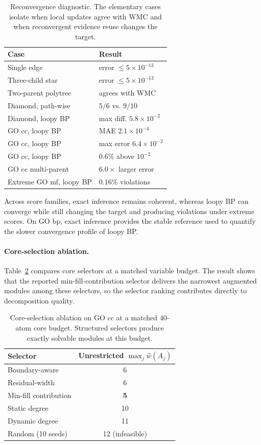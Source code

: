 \documentclass[letterpaper]{article}
\begin{document}
\begin{table}[t]
\centering
\small
\setlength{\tabcolsep}{3pt}
\begin{tabular}{ll}
\toprule
Case & Result \\
\midrule
Single edge & error \(\le 5{\times}10^{-13}\) \\
Three-child star & error \(\le 5{\times}10^{-13}\) \\
Two-parent polytree & agrees with WMC \\
Diamond, path-wise & \(5/6\) vs. \(9/10\) \\
Diamond, loopy BP & max diff. \(5.8{\times}10^{-2}\) \\
GO cc, loopy BP & MAE \(2.1{\times}10^{-4}\) \\
GO cc, loopy BP & max error \(6.4{\times}10^{-2}\) \\
GO cc, loopy BP & \(0.6\%\) above \(10^{-2}\) \\
GO cc multi-parent & \(6.0{\times}\) larger error \\
Extreme GO mf, loopy BP & \(0.16\%\) violations \\
\bottomrule
\end{tabular}
\caption{Reconvergence diagnostic. The elementary cases isolate when
local updates agree with WMC and when reconvergent evidence reuse changes
the target.}
\label{tab:reconv}
\end{table}

Across score families, exact inference remains coherent, whereas loopy
BP can converge while still changing the target and producing violations
under extreme scores. On GO bp, exact inference provides the stable
reference used to quantify the slower convergence profile of loopy BP.

\paragraph{Core-selection ablation.}
Table~\ref{tab:core-ablation} compares core selectors at a matched
variable budget. The result shows that the reported
min-fill-contribution selector delivers the narrowest augmented modules
among these selectors, so the selector ranking contributes directly to
decomposition quality.

\begin{table}[t]
\centering
\small
\setlength{\tabcolsep}{3pt}
\begin{tabular}{lc}
\toprule
Selector & Unrestricted \(\max_j\widehat w(A_j)\) \\
\midrule
Boundary-aware & 6 \\
Residual-width & 6 \\
Min-fill contribution & \textbf{5} \\
Static degree & 10 \\
Dynamic degree & 11 \\
Random (10 seeds) & 12 (infeasible) \\
\bottomrule
\end{tabular}
\caption{Core-selection ablation on GO cc at a matched 40-atom core
budget. Structured selectors produce exactly solvable modules at this
budget.}
\label{tab:core-ablation}
\end{table}
\end{document}

